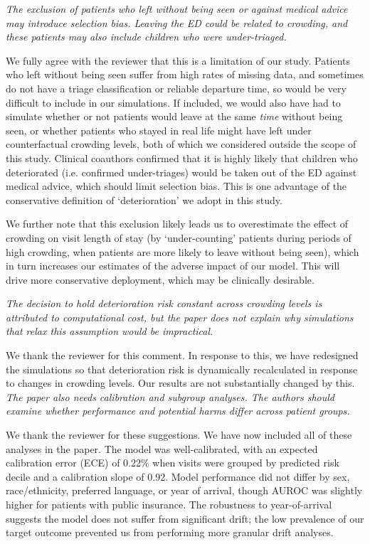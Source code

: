 \textit{     The exclusion of patients who left without being seen or against medical advice may introduce selection bias. Leaving the ED could be related to crowding, and these patients may also include children who were under-triaged.}

We fully agree with the reviewer that this is a limitation of our study.  Patients who left without being seen suffer from high rates of missing data, and sometimes do not have a triage classification or reliable departure time, so would be very difficult to include in our simulations. If included, we would also have had to simulate whether or not patients would leave at the same \textit{time} without being seen, or whether patients who stayed in real life might have left under counterfactual crowding levels, both of which we considered outside the scope of this study. Clinical coauthors confirmed that it is highly likely that children who deteriorated (i.e. confirmed under-triages) would be taken out of the ED against medical advice, which should limit selection bias. This is one advantage of the conservative definition of `deterioration' we adopt in this study.

We further note that this exclusion likely leads us to overestimate the effect of crowding on visit length of stay (by `under-counting' patients during periods of high crowding, when patients are more likely to leave without being seen), which in turn increases our estimates of the adverse impact of our model. This will drive more conservative deployment, which may be clinically desirable.

\textit{     The decision to hold deterioration risk constant across crowding levels is attributed to computational cost, but the paper does not explain why simulations that relax this assumption would be impractical.}

We thank the reviewer for this comment. In response to this, we have redesigned the simulations so that deterioration risk is dynamically recalculated in response to changes in crowding levels. Our results are not substantially changed by this.
\textit{
     The paper also needs calibration and subgroup analyses. The authors should examine whether performance and potential harms differ across patient groups.}

We thank the reviewer for these suggestions. We have now included all of these analyses in the paper. The model was well-calibrated, with an expected calibration error (ECE) of 0.22\% when visits were grouped by predicted risk decile and a calibration slope of 0.92. Model performance did not differ by sex, race/ethnicity, preferred language, or year of arrival, though AUROC was slightly higher for patients with public insurance. The robustness to year-of-arrival suggests the model does not suffer from significant drift; the low prevalence of our target outcome prevented us from performing more granular drift analyses.

